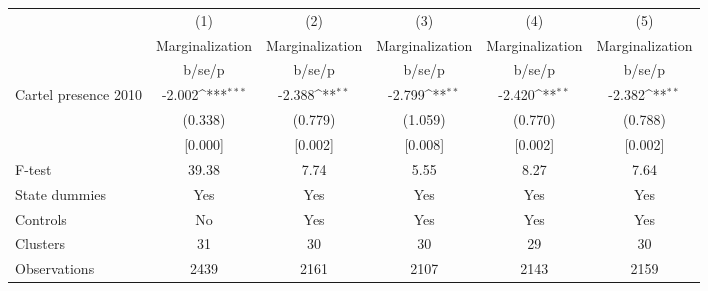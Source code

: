 {
\def\sym#1{\ifmmode^{#1}\else\(^{#1}\)\fi}
\begin{tabular}{l*{5}{c}}
\hline\hline
                    &\multicolumn{1}{c}{(1)}&\multicolumn{1}{c}{(2)}&\multicolumn{1}{c}{(3)}&\multicolumn{1}{c}{(4)}&\multicolumn{1}{c}{(5)}\\
                    &\multicolumn{1}{c}{Marginalization}&\multicolumn{1}{c}{Marginalization}&\multicolumn{1}{c}{Marginalization}&\multicolumn{1}{c}{Marginalization}&\multicolumn{1}{c}{Marginalization}\\
                    &      b/se/p         &      b/se/p         &      b/se/p         &      b/se/p         &      b/se/p         \\
\hline
Cartel presence 2010&      -2.002\sym{***}&      -2.388\sym{**} &      -2.799\sym{**} &      -2.420\sym{**} &      -2.382\sym{**} \\
                    &     (0.338)         &     (0.779)         &     (1.059)         &     (0.770)         &     (0.788)         \\
                    &     [0.000]         &     [0.002]         &     [0.008]         &     [0.002]         &     [0.002]         \\
\hline
F-test              &       39.38         &        7.74         &        5.55         &        8.27         &        7.64         \\
State dummies       &         Yes         &         Yes         &         Yes         &         Yes         &         Yes         \\
Controls            &          No         &         Yes         &         Yes         &         Yes         &         Yes         \\
Clusters            &          31         &          30         &          30         &          29         &          30         \\
Observations        &        2439         &        2161         &        2107         &        2143         &        2159         \\
\hline\hline
\end{tabular}
}

